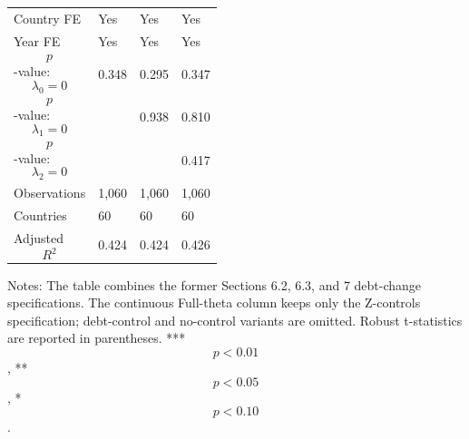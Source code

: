 \begin{table}[H]
\begin{threeparttable}
\begin{tabularx}{\textwidth}{lYYY}
Country FE & Yes & Yes & Yes \\
Year FE & Yes & Yes & Yes \\
$$p$$-value: $$\lambda_0=0$$ & 0.348 & 0.295 & 0.347 \\
$$p$$-value: $$\lambda_1=0$$ &  & 0.938 & 0.810 \\
$$p$$-value: $$\lambda_2=0$$ &  &  & 0.417 \\
Observations & 1,060 & 1,060 & 1,060 \\
Countries & 60 & 60 & 60 \\
Adjusted $$R^2$$ & 0.424 & 0.424 & 0.426 \\
\bottomrule
\end{tabularx}
\begin{tablenotes}[flushleft]\footnotesize
\item Notes: The table combines the former Sections 6.2, 6.3, and 7 debt-change specifications. The continuous Full-theta column keeps only the Z-controls specification; debt-control and no-control variants are omitted. Robust t-statistics are reported in parentheses. *** $$p<0.01$$, ** $$p<0.05$$, * $$p<0.10$$.
\end{tablenotes}
\end{threeparttable}
\end{table}
